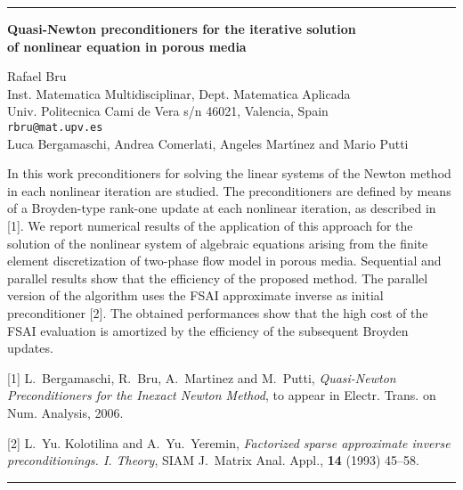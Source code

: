 \documentclass[twosided]{report}
\begin{document}
	\begin{center} \rule{6in}{1pt} \end{center}

\begin{center}
{\large			%
{\bf Quasi-Newton preconditioners for the iterative solution \\
	of nonlinear equation in porous media}}

	Rafael Bru \\
	Inst. Matematica Multidisciplinar, Dept. Matematica Aplicada \\
	Univ. Politecnica Cami de Vera s/n 46021, Valencia, Spain \\
	{\tt rbru@mat.upv.es} \\
	Luca Bergamaschi, Andrea Comerlati,
	Angeles Mart\'{\i}nez and Mario Putti
\end{center}
In this work preconditioners for solving the linear systems
of the Newton method in each nonlinear iteration are
studied. The preconditioners are defined by means of a
Broyden-type rank-one update at each nonlinear iteration, as
described in [1]. We report numerical results of the
application of this approach for the solution of the
nonlinear system of algebraic equations arising from the
finite element discretization of two-phase flow model in
porous media. Sequential and parallel results show that the
efficiency of the proposed method. The parallel version of
the algorithm uses the FSAI approximate inverse as initial
preconditioner [2]. The obtained performances show that the
high cost of the FSAI evaluation is amortized by the
efficiency of the subsequent Broyden updates.

[1]
L.~Bergamaschi, R.~Bru, A.~Martinez and M.~Putti,
{\em Quasi-Newton Preconditioners for the Inexact Newton
Method}, to appear in Electr. Trans. on Num. Analysis,
2006.

[2] L.~Yu. Kolotilina and A.~Yu.~Yeremin,
{\em Factorized sparse approximate inverse preconditionings.
I. Theory},
SIAM J.~Matrix Anal. Appl., {\bf 14} (1993) 45--58.


	\begin{center} \rule{6in}{1pt} \end{center}
\end{document}
